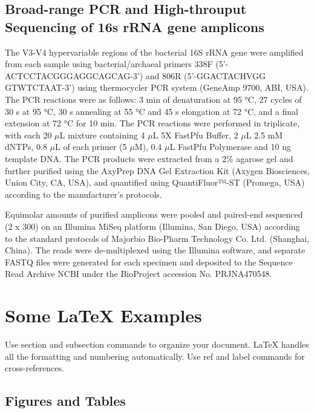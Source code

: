 \documentclass[fleqn,10pt,lineno]{wlpeerj} %
\begin{document}
  \subsection*{Broad-range PCR and High-throuput Sequencing of 16s rRNA gene amplicons}
  The V3-V4 hypervariable regions of the bacterial 16S rRNA gene were amplified from each sample using bacterial/archaeal primers 338F (5’-ACTCCTACGGGAGGCAGCAG-3’) and 806R (5’-GGACTACHVGG GTWTCTAAT-3’) using thermocycler PCR system (GeneAmp 9700, ABI, USA). The PCR reactions were as follows: 3 min of denaturation at 95 °C, 27 cycles of 30 s at 95 °C, 30 s annealing at 55 °C and 45 s elongation at 72 °C, and a final extension at 72 °C for 10 min. The PCR reactions were performed in triplicate, with each 20 $\mu$L mixture containing 4 $\mu$L 5X FastPfu Buffer, 2 $\mu$L 2.5 mM dNTPs, 0.8 $\mu$L of each primer (5 $\mu$M), 0.4 $\mu$L FastPfu Polymerase and 10 ng template DNA. The PCR products were extracted from a 2\% agarose gel and further purified using the AxyPrep DNA Gel Extraction Kit (Axygen Biosciences, Union City, CA, USA), and quantified using QuantiFluor™-ST (Promega, USA) according to the manufacturer’s protocols.

  Equimolar amounts of purified amplicons were pooled and paired-end sequenced (2 x 300) on an Illumina MiSeq platform (Illumina, San Diego, USA) according to the standard protocols of Majorbio Bio-Pharm Technology Co. Ltd. (Shanghai, China). The reads were de-multiplexed using the Illumina software, and separate FASTQ files were generated for each specimen and deposited to the Sequence Read Archive NCBI under the BioProject accession No. PRJNA470548.

  \subsection*{}








\section*{Some \LaTeX{} Examples}
\label{sec:examples}

Use section and subsection commands to organize your document. \LaTeX{} handles all the formatting and numbering automatically. Use ref and label commands for cross-references.

\subsection*{Figures and Tables}
\end{document}
